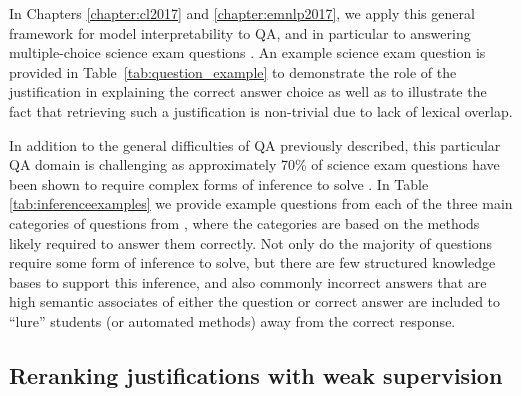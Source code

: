 In Chapters \ref{chapter:cl2017} and \ref{chapter:emnlp2017}, we apply this general framework for model interpretability to QA, and in particular to answering multiple-choice science exam questions \citep{clark:2015}.  An example science exam question is provided in Table~\ref{tab:question_example} to demonstrate the role of the justification in explaining the correct answer choice as well as to illustrate the fact that retrieving such a justification is non-trivial due to lack of lexical overlap. 

In addition to the general difficulties of QA previously described, this particular QA domain is challenging as approximately 70\% of science exam questions have been shown to require complex forms of inference to solve \citep{clark:2013,jansen-EtAl:2016:COLING}.  In Table \ref{tab:inferenceexamples} we provide example questions from each of the three main categories of questions from \citet{clark:2013}, where the categories are based on the methods likely required to answer them correctly.  Not only do the majority of questions require some form of inference to solve, but there are few structured knowledge bases to support this inference, and also commonly incorrect answers that are high semantic associates of either the question or correct answer are included to ``lure'' students (or automated methods) away from the correct response.

\subsection{Reranking justifications with weak supervision}
\label{sec:reranking_justifications}


